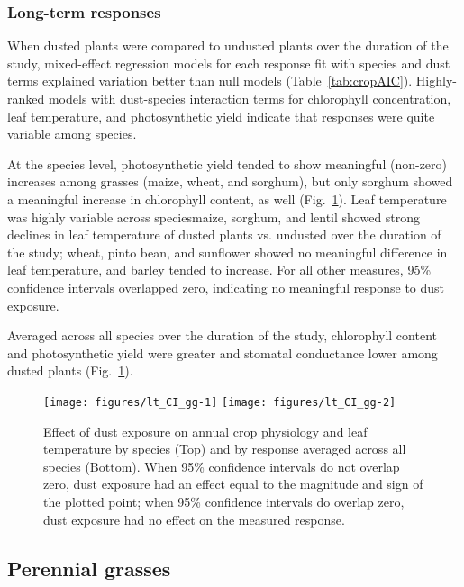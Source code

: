 \documentclass{svjour3}
\begin{document}
\subsubsection{Long-term responses}

When dusted plants were compared to undusted plants over the duration of the study, mixed-effect regression models for each response fit with species and dust terms explained variation better than null models (Table~\ref{tab:cropAIC}). 
Highly-ranked models with dust-species interaction terms for chlorophyll concentration, leaf temperature, and photosynthetic yield indicate that responses were quite variable among species. 

At the species level, photosynthetic yield tended to show meaningful (non-zero) increases among grasses (maize, wheat, and sorghum), but only sorghum showed a meaningful increase in chlorophyll content, as well (Fig.~\ref{fig:lt_cropCIs}). 
Leaf temperature was highly variable across species\textemdash maize, sorghum, and lentil showed strong declines in leaf temperature of dusted plants vs. undusted over the duration of the study; wheat, pinto bean, and sunflower showed no meaningful difference in leaf temperature, and barley tended to increase. 
For all other measures, 95\% confidence intervals overlapped zero, indicating no meaningful response to dust exposure. 

Averaged across all species over the duration of the study, chlorophyll content and photosynthetic yield were greater and stomatal conductance lower among dusted plants (Fig.~\ref{fig:lt_cropCIs}). 


 

\begin{figure}
  \texttt{[image: figures/lt\_CI\_gg-1]}
  \texttt{[image: figures/lt\_CI\_gg-2]}
  \caption{Effect of dust exposure on annual crop physiology and leaf temperature by species (Top) and by response averaged across all species (Bottom). 
  	When 95\% confidence intervals do not overlap zero, dust exposure had an effect equal to the magnitude and sign of the plotted point; when 95\% confidence intervals do overlap zero, dust exposure had no effect on the measured response. \label{fig:lt_cropCIs} }
\end{figure}

\subsection{Perennial grasses} 
\end{document}
